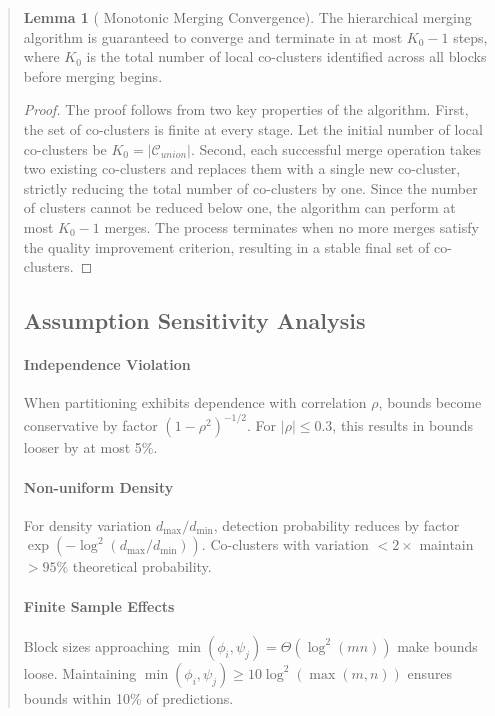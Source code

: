 \documentclass{ar2rc}
\theoremstyle{definition}
\newtheorem*{lemma*}{Lemma}
\theoremstyle{remark} %
\begin{document}
\begin{quote}
  \begin{lemma*}[ Monotonic Merging Convergence]
    The hierarchical merging algorithm is guaranteed to converge and terminate in at most $K_0 - 1$ steps, where $K_0$ is the total number of local co-clusters identified across all blocks before merging begins.
  \end{lemma*}
  \begin{proof}
    The proof follows from two key properties of the algorithm. First, the set of co-clusters is finite at every stage. Let the initial number of local co-clusters be $K_0 = |\mathcal{C}_{union}|$. Second, each successful merge operation takes two existing co-clusters and replaces them with a single new co-cluster, strictly reducing the total number of co-clusters by one. Since the number of clusters cannot be reduced below one, the algorithm can perform at most $K_0 - 1$ merges. The process terminates when no more merges satisfy the quality improvement criterion, resulting in a stable final set of co-clusters.
  \end{proof}

  \subsection*{ Assumption Sensitivity Analysis}

  \paragraph{Independence Violation}{When partitioning exhibits dependence with correlation $\rho$, bounds become conservative by factor $(1-\rho^2)^{-1/2}$. For $|\rho| \leq 0.3$, this results in bounds looser by at most 5\%.}

  \paragraph{Non-uniform Density}{For density variation $d_{\max}/d_{\min}$, detection probability reduces by factor $\exp(-\log^2(d_{\max}/d_{\min}))$. Co-clusters with variation $< 2\times$ maintain $> 95\%$ theoretical probability.}

  \paragraph{Finite Sample Effects}{Block sizes approaching $\min(\phi_i, \psi_j) = \Theta(\log^2(mn))$ make bounds loose. Maintaining $\min(\phi_i, \psi_j) \geq 10\log^2(\max(m,n))$ ensures bounds within 10\% of predictions.}


\end{quote}
\end{document}

